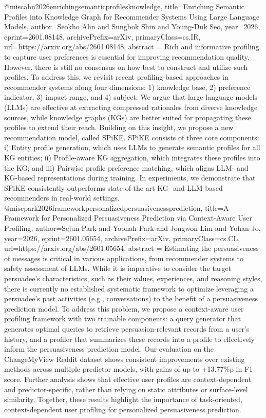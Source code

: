 {}@misc{ahn2026enrichingsemanticprofilesknowledge,
      title={Enriching Semantic Profiles into Knowledge Graph for Recommender Systems Using Large Language Models}, 
      author={Seokho Ahn and Sungbok Shin and Young-Duk Seo},
      year={2026},
      eprint={2601.08148},
      archivePrefix={arXiv},
      primaryClass={cs.IR},
      url={https://arxiv.org/abs/2601.08148},
      abstract = {Rich and informative profiling to capture user preferences is essential for improving recommendation quality. However, there is still no consensus on how best to construct and utilize such profiles. To address this, we revisit recent profiling-based approaches in recommender systems along four dimensions: 1) knowledge base, 2) preference indicator, 3) impact range, and 4) subject. We argue that large language models (LLMs) are effective at extracting compressed rationales from diverse knowledge sources, while knowledge graphs (KGs) are better suited for propagating these profiles to extend their reach. Building on this insight, we propose a new recommendation model, called SPiKE. SPiKE consists of three core components: i) Entity profile generation, which uses LLMs to generate semantic profiles for all KG entities; ii) Profile-aware KG aggregation, which integrates these profiles into the KG; and iii) Pairwise profile preference matching, which aligns LLM- and KG-based representations during training. In experiments, we demonstrate that SPiKE consistently outperforms state-of-the-art KG- and LLM-based recommenders in real-world settings.}
}@misc{park2026frameworkpersonalizedpersuasivenessprediction,
      title={A Framework for Personalized Persuasiveness Prediction via Context-Aware User Profiling}, 
      author={Sejun Park and Yoonah Park and Jongwon Lim and Yohan Jo},
      year={2026},
      eprint={2601.05654},
      archivePrefix={arXiv},
      primaryClass={cs.CL},
      url={https://arxiv.org/abs/2601.05654},
      abstract = {Estimating the persuasiveness of messages is critical in various applications, from recommender systems to safety assessment of LLMs. While it is imperative to consider the target persuadee's characteristics, such as their values, experiences, and reasoning styles, there is currently no established systematic framework to optimize leveraging a persuadee's past activities (e.g., conversations) to the benefit of a persuasiveness prediction model. To address this problem, we propose a context-aware user profiling framework with two trainable components: a query generator that generates optimal queries to retrieve persuasion-relevant records from a user's history, and a profiler that summarizes these records into a profile to effectively inform the persuasiveness prediction model. Our evaluation on the ChangeMyView Reddit dataset shows consistent improvements over existing methods across multiple predictor models, with gains of up to +13.77\%p in F1 score. Further analysis shows that effective user profiles are context-dependent and predictor-specific, rather than relying on static attributes or surface-level similarity. Together, these results highlight the importance of task-oriented, context-dependent user profiling for personalized persuasiveness prediction.}
}
